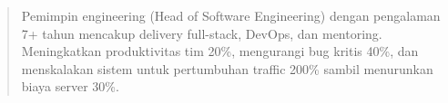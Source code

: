 \begin{quote}
Pemimpin engineering (Head of Software Engineering) dengan pengalaman 7+ tahun mencakup delivery full-stack, DevOps, dan mentoring. Meningkatkan produktivitas tim 20\%, mengurangi bug kritis 40\%, dan menskalakan sistem untuk pertumbuhan traffic 200\% sambil menurunkan biaya server 30\%.
\end{quote}
\divider
{}

\par{}
 \\
 \\
   
\divider\smallskip
{}  \\
   
\par
